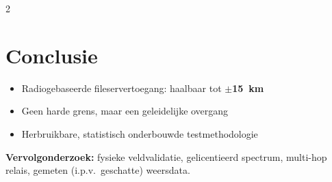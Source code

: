 \documentclass[a0,portrait]{hogent-poster}
\begin{document}
\begin{multicols}{2}
\section{Conclusie}

\begin{itemize}
  \item Radiogebaseerde fileservertoegang: haalbaar tot \textbf{$\pm$15~km}
  \item Geen harde grens, maar een geleidelijke overgang
  \item Herbruikbare, statistisch onderbouwde testmethodologie
\end{itemize}

\textbf{Vervolgonderzoek:} fysieke veldvalidatie, gelicentieerd spectrum, multi-hop
relais, gemeten (i.p.v.\ geschatte) weersdata.

\end{multicols}
\end{document}

